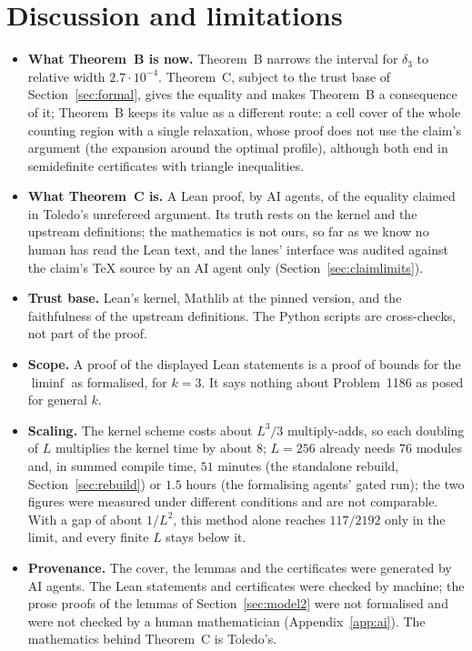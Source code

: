 \documentclass[11pt]{amsart}
\theoremstyle{remark}
\begin{document}
\section{Discussion and limitations}\label{sec:disc}
\begin{itemize}
\item \textbf{What Theorem~B is now.} Theorem~B narrows the interval for $\delta_3$ to relative width $2.7\cdot10^{-4}$. Theorem~C, subject to the trust base of Section~\ref{sec:formal}, gives the equality and makes Theorem~B a consequence of it; Theorem~B keeps its value as a different route: a cell cover of the whole counting region with a single relaxation, whose proof does not use the claim's argument (the expansion around the optimal profile), although both end in semidefinite certificates with triangle inequalities.
\item \textbf{What Theorem~C is.} A Lean proof, by AI agents, of the equality claimed in Toledo's unrefereed argument. Its truth rests on the kernel and the upstream definitions; the mathematics is not ours, so far as we know no human has read the Lean text, and the lanes' interface was audited against the claim's TeX source by an AI agent only (Section~\ref{sec:claimlimits}).
\item \textbf{Trust base.} Lean's kernel, Mathlib at the pinned version, and the faithfulness of the upstream definitions. The Python scripts are cross-checks, not part of the proof.
\item \textbf{Scope.} A proof of the displayed Lean statements is a proof of bounds for the $\liminf$ as formalised, for $k=3$. It says nothing about Problem~1186 as posed for general $k$.
\item \textbf{Scaling.} The kernel scheme costs about $L^3/3$ multiply-adds, so each doubling of $L$ multiplies the kernel time by about $8$; $L=256$ already needs $76$ modules and, in summed compile time, $51$ minutes (the standalone rebuild, Section~\ref{sec:rebuild}) or $1.5$ hours (the formalising agents' gated run); the two figures were measured under different conditions and are not comparable. With a gap of about $1/L^2$, this method alone reaches $117/2192$ only in the limit, and every finite $L$ stays below it.
\item \textbf{Provenance.} The cover, the lemmas and the certificates were generated by AI agents. The Lean statements and certificates were checked by machine; the prose proofs of the lemmas of Section~\ref{sec:model2} were not formalised and were not checked by a human mathematician (Appendix~\ref{app:ai}). The mathematics behind Theorem~C is Toledo's.
\end{itemize}
\end{document}
